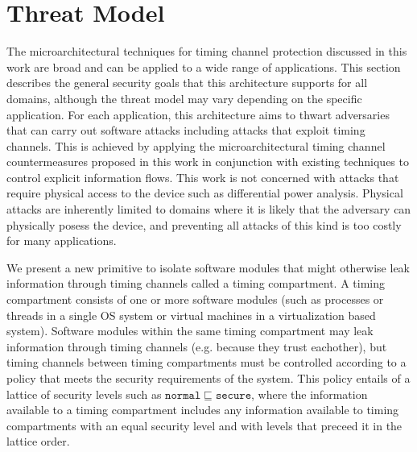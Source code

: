 \section{Threat Model}
    The microarchitectural techniques for timing channel protection discussed 
    in this work are broad and can be applied to a wide range of applications.  
    This section describes the general security goals that this architecture 
    supports for all domains, although the threat model may vary depending on 
    the specific application. For each application, this architecture aims to 
    thwart adversaries that can carry out software attacks including attacks
    that exploit timing channels. This is achieved by applying the 
    microarchitectural timing channel countermeasures proposed in this work in 
    conjunction with existing techniques to control explicit information flows. 
    This work is not concerned with attacks that require physical access to the 
    device such as differential power analysis. Physical attacks are inherently 
    limited to domains where it is likely that the adversary can physically 
    posess the device, and preventing all attacks of this kind is too costly 
    for many applications.

    We present a new primitive to isolate software modules that might otherwise 
    leak information through timing channels called a timing compartment.  A 
    timing compartment consists of one or more software modules (such as 
    processes or threads in a single OS system or virtual machines in a 
    virtualization based system).  Software modules within the same timing 
    compartment may leak information through timing channels (e.g. because they 
    trust eachother), but timing channels between timing compartments must be 
    controlled according to a policy that meets the security requirements of 
    the system. This policy entails of a lattice of security levels such as 
    $\mathtt{normal} \sqsubseteq \mathtt{secure}$, where the information 
    available to a timing compartment includes any information available to 
    timing compartments with an equal security level and with levels that 
    preceed it in the lattice order. 

